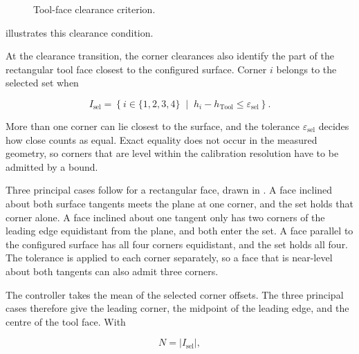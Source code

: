 \begin{figure}[H]
  \centering
  
  \caption{Tool-face clearance criterion.}
  \label{fig:tool_clearance_criterion}
\end{figure}

\mbox{} illustrates this clearance
condition.

At the clearance transition, the corner clearances also identify the part of
the rectangular tool face closest to the configured surface. Corner
\mbox{\(i\)} belongs to the selected set when

\begin{equation}
I_{\mathrm{sel}}
=
\left\{
i\in\{1,2,3,4\}
\;\middle|\;
h_i-h_{\mathrm{Tool}}\leq\varepsilon_{\mathrm{sel}}
\right\}.
\label{eq:implementation_selected_corner_set}
\end{equation}

More than one corner can lie closest to the surface, and the tolerance
\mbox{\(\varepsilon_{\mathrm{sel}}\)} decides how close counts as equal. Exact
equality does not occur in the measured geometry, so corners that are level
within the calibration resolution have to be admitted by a bound.

\begin{figure}[H]
  \centering
  
  \caption[Principal selected tool points for the rectangular tool face.]{%
    }
  \label{fig:leading_feature_cases}
\end{figure}

Three principal cases follow for a rectangular face, drawn in
\mbox{}. A face inclined about both
surface tangents meets the plane at one corner, and the set holds that corner
alone. A face inclined about one tangent only has two corners of the leading
edge equidistant from the plane, and both enter the set. A face parallel to the
configured surface has all four corners equidistant, and the set holds all
four. The tolerance is applied to each corner separately, so a face that is
near-level about both tangents can also admit three corners.

The controller takes the mean of the selected corner offsets. The three
principal cases therefore give the leading corner, the midpoint of the leading
edge, and the centre of the tool face. With

\[
N=\lvert I_{\mathrm{sel}}\rvert,
\]

